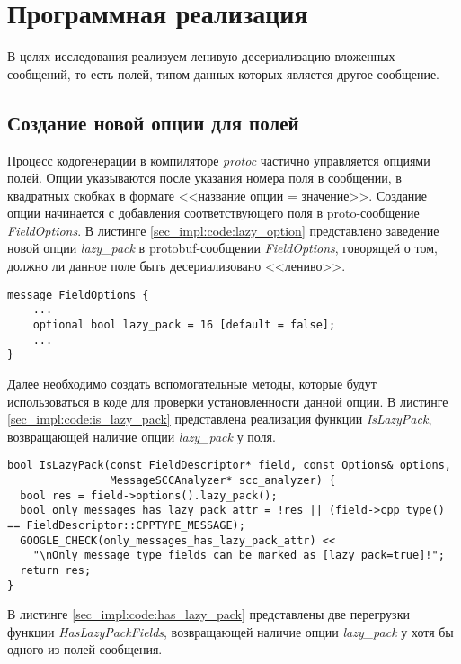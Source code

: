 \section{Программная реализация}

В целях исследования реализуем ленивую десериализацию вложенных сообщений, то есть полей, типом данных которых является другое сообщение.

\subsection{Создание новой опции для полей}

Процесс кодогенерации в компиляторе \textit{protoc} частично управляется опциями полей.
Опции указываются после указания номера поля в сообщении, в квадратных скобках в формате <<название опции = значение>>.
Создание опции начинается с добавления соответствующего поля в proto-сообщение \textit{FieldOptions}.
В листинге \ref{sec_impl:code:lazy_option} представлено заведение новой опции \textit{lazy\_pack} в protobuf-сообщении \textit{FieldOptions}, говорящей о том, должно ли данное поле быть десериализовано <<лениво>>.
\begin{lstlisting}[style=CodeListing, label=sec_impl:code:lazy_option, caption={Добавление поддержки опции lazy\_pack в компилятор}]
message FieldOptions {
    ...
    optional bool lazy_pack = 16 [default = false];
    ...
}
\end{lstlisting}

Далее необходимо создать вспомогательные методы, которые будут использоваться в коде для проверки установленности данной опции.
В листинге \ref{sec_impl:code:is_lazy_pack} представлена реализация функции \textit{IsLazyPack}, возвращающей наличие опции \textit{lazy\_pack} у поля.

\begin{lstlisting}[style=CodeListing, label=sec_impl:code:is_lazy_pack, caption={Функция для определения наличия опции lazy\_pack}]
bool IsLazyPack(const FieldDescriptor* field, const Options& options,
                MessageSCCAnalyzer* scc_analyzer) {
  bool res = field->options().lazy_pack();
  bool only_messages_has_lazy_pack_attr = !res || (field->cpp_type() == FieldDescriptor::CPPTYPE_MESSAGE); 
  GOOGLE_CHECK(only_messages_has_lazy_pack_attr) << 
    "\nOnly message type fields can be marked as [lazy_pack=true]!";
  return res;
}
\end{lstlisting}

В листинге \ref{sec_impl:code:has_lazy_pack} представлены две перегрузки функции \textit{HasLazyPackFields}, возвращающей наличие опции \textit{lazy\_pack} у хотя бы одного из полей сообщения.

